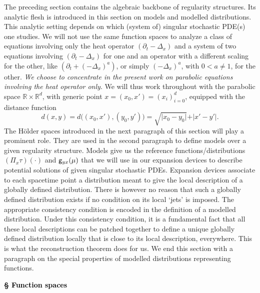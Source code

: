 \documentclass[10pt, reqno]{amsart}
\numberwithin{subsection}{section}
\numberwithin{subsubsection}{subsection}
\numberwithin{equation}{section} %
\theoremstyle{mystyle}
\theoremstyle{mystyle2}
\theoremstyle{mystyle3}
\newcommand\bbR{\mathbb{R}}
\begin{document}
The preceding section contains the algebraic backbone of regularity structures. Its analytic flesh is introduced in this section on models and modelled distributions. This analytic setting depends on which (system of) singular stochastic PDE(s) one studies. We will not use the same function spaces to analyze a class of equations involving only the heat operator $(\partial_t-\Delta_x)$ and a system of two equations involving $(\partial_t-\Delta_x)$ for one and an operator with a different scaling for the other, like $(\partial_t + (-\Delta_x)^a)$, or simply $(-\Delta_x)^a$, with 
$0<a\neq1$, for the other. {\it We choose to concentrate in the present work on parabolic equations involving the heat operator only}. We will thus work throughout with the parabolic space $\bbR\times\bbR^d$, with generic point $x=(x_0,x')=(x_i)_{i=0}^d$, equipped with the distance function
$$
d(x,y) = d\big((x_0,x'),(y_0,y')\big) = \sqrt{\vert x_0-y_0\vert} + \vert x'-y'\vert.
$$
The H\"older spaces introduced in the next paragraph of this section will play a prominent role. They are used in the second paragraph to define models over a given regularity structure. Models give us the reference functions/distributions $(\Pi_x\tau)(\cdot)$ and ${\sf g}_{yx}(\mu)$ that we will use in our expansion devices to describe potential solutions of given singular stochastic PDEs. Expansion devices associate to each spacetime point a distribution meant to give the local description of a globally 
defined distribution. There is however no reason that such a globally defined distribution exists if no condition on its local `jets' is imposed. The appropriate consistency condition is encoded in the definition of a modelled distribution. Under this consistency condition, it is a fundamental fact that all these local descriptions can be patched together to define a unique globally defined distribution locally that is close to its local description, everywhere. This is what the reconstruction theorem does 
for us. We end this section with a paragraph on the special properties of 
modelled distributions representing functions.   


\vfill \pagebreak


\hfill \textcolor{black}{\textsf{\textbf{ {\Large \S} Function spaces}}}

\medskip
\end{document}
